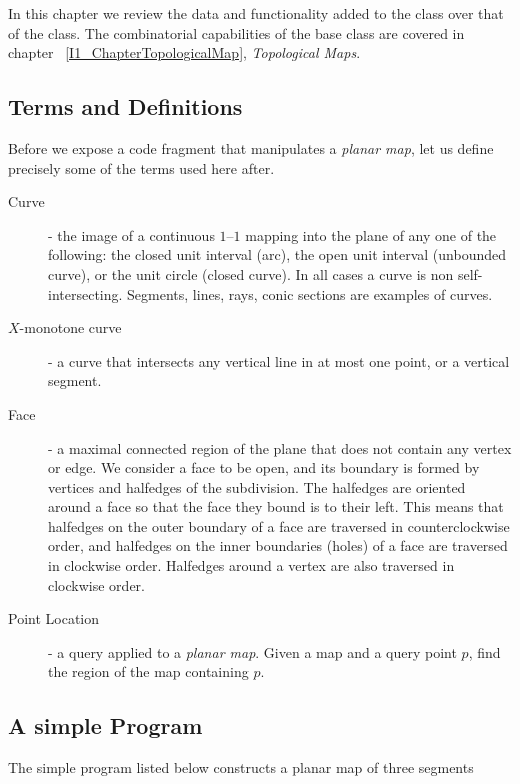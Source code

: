 In this chapter we review the data and functionality added
to the  class over that of the 
 class. The combinatorial capabilities of
the base class are covered in chapter ~\ref{I1_ChapterTopologicalMap},
{\em Topological Maps}.

\subsection{Terms and Definitions}
Before we expose a code fragment that manipulates a {\em planar
map}, let us define precisely some of the terms used here after.

\begin{description}
\item[Curve] - the image of a continuous $1$--$1$ mapping into the
plane of any one of the following: the closed unit interval (arc), the
open unit interval (unbounded curve), or the unit circle (closed
curve). In all cases a curve is non self-intersecting. Segments,
lines, rays, conic sections are examples of curves.

\item[{\boldmath $X$}-monotone curve] - a curve that intersects
any vertical line in at most one point, or a vertical segment.

\item[Face] - a maximal connected region of the plane that does not
contain any vertex or edge. We consider a face to be open, and its
boundary is formed by vertices and halfedges of the subdivision.
The halfedges are oriented around a face so that the face they bound 
is to their left. This means that halfedges on the outer boundary
of a face are traversed in counterclockwise order, and halfedges on
the inner boundaries (holes) of a face are traversed in clockwise
order. Halfedges around a vertex are also traversed in clockwise order. 

\item[Point Location] - a query applied to a {\em planar map}. Given a
map and a query point $p$, find the region of the map containing $p$.
\end{description}

\subsection{A simple Program}
The simple program listed below constructs a planar map of three segments

